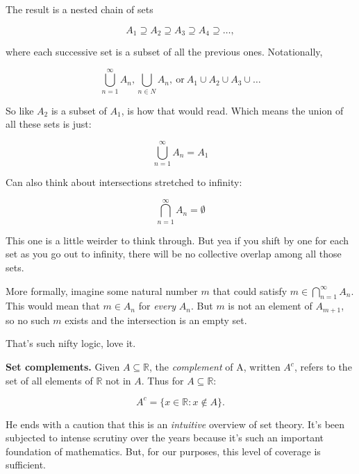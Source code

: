 \documentclass{article}
\numberwithin{equation}{subsection}
\numberwithin{theo}{subsection}
\begin{document}
The result is a nested chain of sets

\begin{equation*}
    A_1 \supseteq A_2 \supseteq A_3 \supseteq A_4 \supseteq \ldots,
\end{equation*}

where each successive set is a subset of all the previous ones. Notationally,

\begin{equation*}
    \bigcup\limits_{n=1}^\infty A_n, \bigcup\limits_{n\in N} A_n,~\text{or} ~ 
    A_1 \cup A_2 \cup A_3 \cup \ldots
\end{equation*}

So like $A_2$ is a subset of $A_1$, is how that would read. Which means the
union of all these sets is just:

\begin{equation*}
    \bigcup\limits_{n=1}^\infty A_n = A_1
\end{equation*}

Can also think about intersections stretched to infinity:

\begin{equation*}
    \bigcap\limits_{n=1}^\infty A_n = \emptyset
\end{equation*}

This one is a little weirder to think through. But yea if you shift by one for
each set as you go out to infinity, there will be no collective overlap among
all those sets.

More formally, imagine some natural number $m$ that could satisfy $m \in
\bigcap_{n=1}^\infty A_n$. This would mean that $m \in A_n$ for
\emph{every} $A_n$. But $m$ is not an element of $A_{m+1}$, so no such $m$
exists and the intersection is an empty set.

That's such nifty logic, love it.

\textbf{Set complements.} Given $A \subseteq \mathbb{R}$, the \emph{complement} of A,
written $A^c$, refers to the set of all elements of $\mathbb{R}$ not in $A$.
Thus for $A \subseteq \mathbb{R}$:

\begin{equation*}
    A^c = \{x \in \mathbb{R}: x \notin A\}.
\end{equation*}

He ends with a caution that this is an \emph{intuitive} overview of set theory.
It's been subjected to intense scrutiny over the years because it's such an
important foundation of mathematics. But, for our purposes, this level of
coverage is sufficient.
\end{document}
